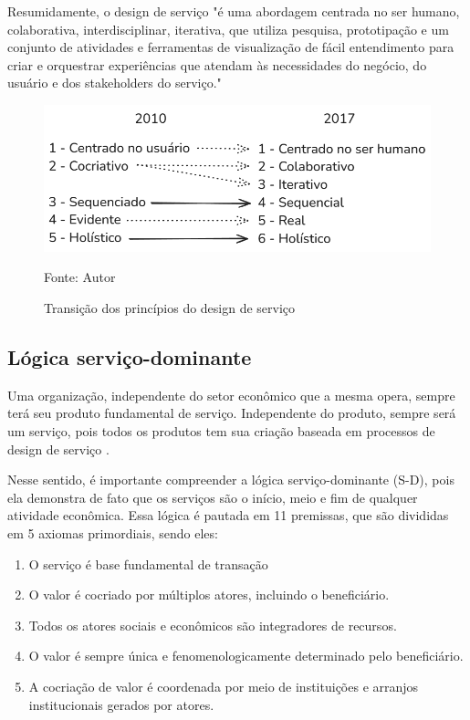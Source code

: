Resumidamente, o design de serviço "é uma abordagem centrada no ser humano, colaborativa, interdisciplinar, iterativa, que utiliza pesquisa, prototipação e um conjunto de atividades e ferramentas de visualização de fácil entendimento para criar e orquestrar experiências que atendam às necessidades do negócio, do usuário e dos stakeholders do serviço."\cite{Stickdorn2019}

\begin{figure}[h]
	\centering %
	\includegraphics[width=16cm]{figuras/principios.png} %
	\caption{Transição dos princípios do design de serviço}
	Fonte: Autor
	\label{figura:qualquernome}
\end{figure}

\subsection{Lógica serviço-dominante}

Uma organização, independente do setor econômico que a mesma opera, sempre terá seu produto fundamental de serviço. Independente do produto, sempre será um serviço, pois todos os produtos tem sua criação baseada em processos de design de serviço \cite{Stickdorn2019}.

Nesse sentido, é importante compreender a lógica serviço-dominante (S-D), pois ela demonstra de fato que os serviços são o início, meio e fim de qualquer atividade econômica. Essa lógica é pautada em 11 premissas, que são divididas em 5 axiomas primordiais, sendo eles:

\begin{enumerate}
	\item O serviço é base fundamental de transação
	\item O valor é cocriado por múltiplos atores, incluindo o beneficiário.
	\item Todos os atores sociais e econômicos são integradores de recursos.
	\item O valor é sempre única e fenomenologicamente determinado pelo beneficiário.
	\item A cocriação de valor é coordenada por meio de instituições e arranjos institucionais gerados por atores. 
\end{enumerate}

